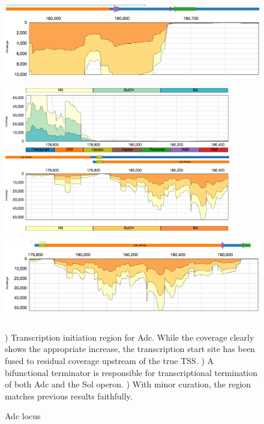 \begin{figure}
\small
{\includegraphics[width=\textwidth,height=1.5in]{images/Assembly/Examples/Sol/Adc-TSS.png}
\label{fig:5.10a}}
{\includegraphics[width=\textwidth,height=2.5in]{images/Assembly/Examples/Sol/Sol-bifunctional-terminator.png}
\label{fig:5.10b}}
{\includegraphics[width=\textwidth,height=1.5in]{images/Assembly/Examples/Sol/Adc-curated.png}
\label{fig:5.10c}}
\caption{Adc locus}
) Transcription initiation region for Adc. While the coverage clearly shows the appropriate increase, the transcription start site has been fused to residual coverage upstream of the true TSS. ) A bifunctional terminator is responsible for transcriptional termination of both Adc and the Sol operon. ) With minor curation, the region matches previous results faithfully.
\end{figure}


